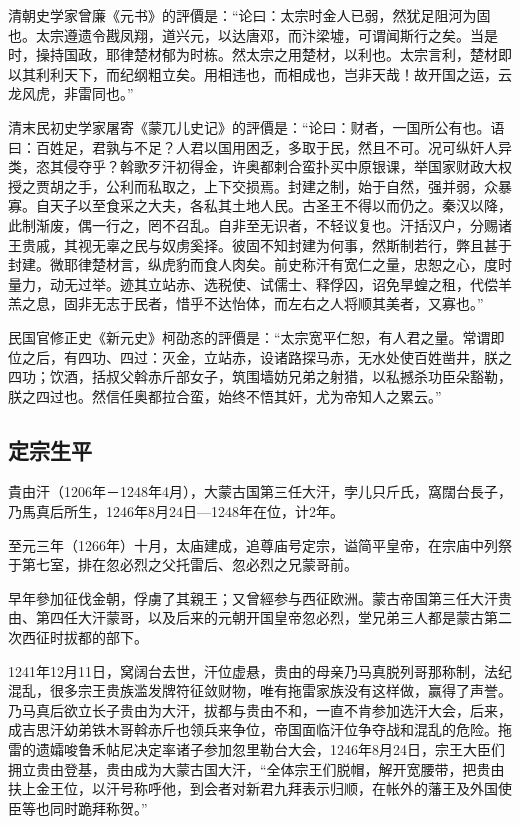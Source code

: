 清朝史学家曾廉《元书》的評價是：“论曰：太宗时金人已弱，然犹足阻河为固也。太宗遵遗令戡凤翔，道兴元，以达唐邓，而汴梁墟，可谓闻斯行之矣。当是时，操持国政，耶律楚材郁为时栋。然太宗之用楚材，以利也。太宗言利，楚材即以其利利天下，而纪纲粗立矣。用相违也，而相成也，岂非天哉！故开国之运，云龙风虎，非雷同也。”

清末民初史学家屠寄《蒙兀儿史记》的評價是：“论曰：财者，一国所公有也。语曰：百姓足，君孰与不足？人君以国用困乏，多取于民，然且不可。况可纵奸人异类，恣其侵夺乎？斡歌歹汗初得金，许奥都剌合蛮扑买中原银课，举国家财政大权授之贾胡之手，公利而私取之，上下交损焉。封建之制，始于自然，强并弱，众暴寡。自天子以至食采之大夫，各私其土地人民。古圣王不得以而仍之。秦汉以降，此制渐废，偶一行之，罔不召乱。自非至无识者，不轻议复也。汗括汉户，分赐诸王贵戚，其视无辜之民与奴虏奚择。彼固不知封建为何事，然斯制若行，弊且甚于封建。微耶律楚材言，纵虎豹而食人肉矣。前史称汗有宽仁之量，忠恕之心，度时量力，动无过举。迹其立站赤、选税使、试儒士、释俘囚，诏免旱蝗之租，代偿羊羔之息，固非无志于民者，惜乎不达怡体，而左右之人将顺其美者，又寡也。”

民国官修正史《新元史》柯劭忞的評價是：“太宗宽平仁恕，有人君之量。常谓即位之后，有四功、四过：灭金，立站赤，设诸路探马赤，无水处使百姓凿井，朕之四功；饮酒，括叔父斡赤斤部女子，筑围墙妨兄弟之射猎，以私撼杀功臣朵豁勒，朕之四过也。然信任奥都拉合蛮，始终不悟其奸，尤为帝知人之累云。”


\subsection{定宗生平}


貴由汗（1206年－1248年4月），大蒙古国第三任大汗，孛儿只斤氏，窩闊台長子，乃馬真后所生，1246年8月24日—1248年在位，计2年。

至元三年（1266年）十月，太庙建成，追尊庙号定宗，谥简平皇帝，在宗庙中列祭于第七室，排在忽必烈之父托雷后、忽必烈之兄蒙哥前。

早年參加征伐金朝，俘虜了其親王；又曾經参与西征欧洲。蒙古帝国第三任大汗贵由、第四任大汗蒙哥，以及后来的元朝开国皇帝忽必烈，堂兄弟三人都是蒙古第二次西征时拔都的部下。

1241年12月11日，窝阔台去世，汗位虚悬，贵由的母亲乃马真脱列哥那称制，法纪混乱，很多宗王贵族滥发牌符征敛财物，唯有拖雷家族没有这样做，赢得了声誉。乃马真后欲立长子贵由为大汗，拔都与贵由不和，一直不肯参加选汗大会，后来，成吉思汗幼弟铁木哥斡赤斤也领兵来争位，帝国面临汗位争夺战和混乱的危险。拖雷的遗孀唆鲁禾帖尼决定率诸子参加忽里勒台大会，1246年8月24日，宗王大臣们拥立贵由登基，贵由成为大蒙古国大汗，“全体宗王们脱帽，解开宽腰带，把贵由扶上金王位，以汗号称呼他，到会者对新君九拜表示归顺，在帐外的藩王及外国使臣等也同时跪拜称贺。”

